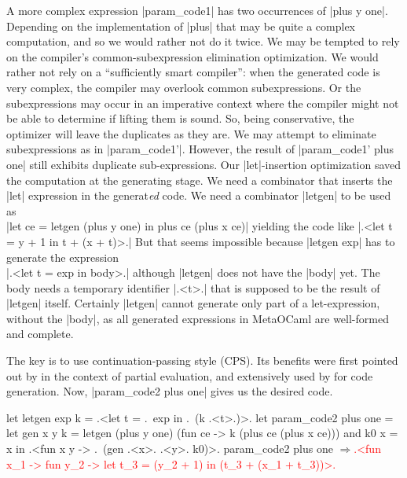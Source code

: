 \documentclass{llncs}
\newcommand{\evalresult}[1]{\ensuremath{\Longrightarrow}\textcolor{red}{#1}}
\begin{document}
A more complex expression |param_code1| has two occurrences of 
|plus y one|. Depending on the implementation of |plus| that may be quite a
complex computation, and so we would rather not do it twice. We may be
tempted to rely on the compiler's common-subexpression elimination
optimization. We would rather not rely on a ``sufficiently smart
compiler'': when the generated code is very complex, the compiler may
overlook common subexpressions.  Or the subexpressions may occur in an
imperative context where the compiler might not be able to determine
if lifting them is sound. So, being conservative, the optimizer will
leave the duplicates as they are. We may attempt to eliminate
subexpressions as in |param_code1'|. However, the result of
|param_code1' plus one| still exhibits duplicate sub-expressions. 
Our |let|-insertion
optimization saved the computation at the generating stage. 
We need a combinator that inserts the |let| expression in the
generat\emph{ed} code. We need a combinator |letgen| to be used
as\\|let ce = letgen (plus y one) in plus ce (plus x ce)| 
yielding the code like |.<let t = y + 1 in t + (x + t)>.|
But that seems impossible because |letgen exp| has to generate
the expression\\|.<let t = exp in body>.| although |letgen| does not have
the |body| yet. The body needs a temporary identifier |.<t>.| that
is supposed to be the result of |letgen| itself. 
Certainly |letgen| cannot generate only part of a let-expression,
without the |body|,  as all generated expressions in
MetaOCaml are well-formed and complete.

The key is to use continuation-passing style (CPS). Its benefits were first
pointed out by \cite{Bondorf:92} in the context
of partial evaluation, and extensively used by \cite{KiselyovTaha} for code
generation. Now, |param_code2 plus one| gives us the desired code. 

\begin{small}
\begin{code}
let letgen exp k = .<let t = .~exp in .~(k .<t>.)>.
let param_code2 plus one =
  let gen x y k = letgen (plus y one) (fun ce -> k (plus ce (plus x ce)))
  and k0 x = x
  in .<fun x y -> .~(gen .<x>. .<y>. k0)>.
param_code2 plus one
\evalresult{.<fun x_1 -> fun y_2 -> let t_3 = (y_2 + 1) in (t_3 + (x_1 + t_3))>.}
\end{code}
\end{small}
\end{document}

